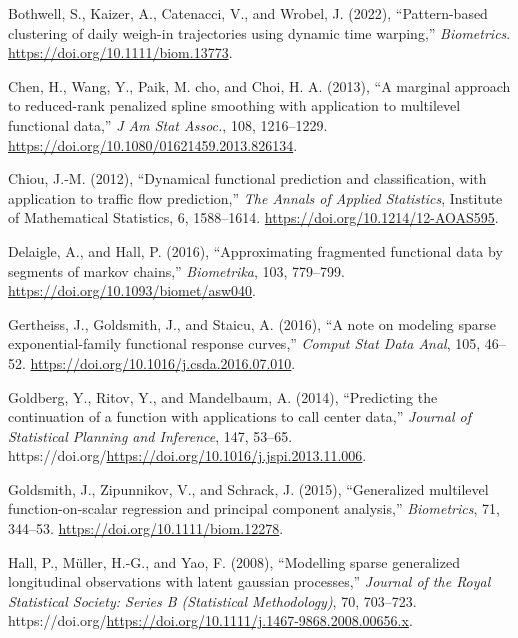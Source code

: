 \documentclass[
  11pt,
]{article}
\newlength{\cslhangindent}
\newlength{\cslentryspacingunit} %
\newenvironment{CSLReferences}[2] %
 {%
  \setlength{\parindent}{0pt}
  \ifodd #1
  \let\oldpar\par
  \def\par{\hangindent=\cslhangindent\oldpar}
  \fi
  \setlength{\parskip}{#2\cslentryspacingunit}
 }%
 {}
\begin{document}
\hypertarget{refs}{}
\begin{CSLReferences}{1}{0}
\leavevmode{}%
Bothwell, S., Kaizer, A., Catenacci, V., and Wrobel, J. (2022),
{``Pattern-based clustering of daily weigh-in trajectories using dynamic
time warping,''} \emph{Biometrics}.
\url{https://doi.org/10.1111/biom.13773}.

\leavevmode{}%
Chen, H., Wang, Y., Paik, M. cho, and Choi, H. A. (2013), {``A marginal
approach to reduced-rank penalized spline smoothing with application to
multilevel functional data,''} \emph{J Am Stat Assoc.}, 108, 1216--1229.
\url{https://doi.org/10.1080/01621459.2013.826134}.

\leavevmode{}%
Chiou, J.-M. (2012), {``Dynamical functional prediction and
classification, with application to traffic flow prediction,''}
\emph{The Annals of Applied Statistics}, Institute of Mathematical
Statistics, 6, 1588--1614. \url{https://doi.org/10.1214/12-AOAS595}.

\leavevmode{}%
Delaigle, A., and Hall, P. (2016), {``Approximating fragmented
functional data by segments of markov chains,''} \emph{Biometrika}, 103,
779--799. \url{https://doi.org/10.1093/biomet/asw040}.

\leavevmode{}%
Gertheiss, J., Goldsmith, J., and Staicu, A. (2016), {``A note on
modeling sparse exponential-family functional response curves,''}
\emph{Comput Stat Data Anal}, 105, 46--52.
\url{https://doi.org/10.1016/j.csda.2016.07.010}.

\leavevmode{}%
Goldberg, Y., Ritov, Y., and Mandelbaum, A. (2014), {``Predicting the
continuation of a function with applications to call center data,''}
\emph{Journal of Statistical Planning and Inference}, 147, 53--65.
https://doi.org/\url{https://doi.org/10.1016/j.jspi.2013.11.006}.

\leavevmode{}%
Goldsmith, J., Zipunnikov, V., and Schrack, J. (2015), {``Generalized
multilevel function-on-scalar regression and principal component
analysis,''} \emph{Biometrics}, 71, 344--53.
\url{https://doi.org/10.1111/biom.12278}.

\leavevmode{}%
Hall, P., Müller, H.-G., and Yao, F. (2008), {``Modelling sparse
generalized longitudinal observations with latent gaussian processes,''}
\emph{Journal of the Royal Statistical Society: Series B (Statistical
Methodology)}, 70, 703--723.
https://doi.org/\url{https://doi.org/10.1111/j.1467-9868.2008.00656.x}.


\end{CSLReferences}
\end{document}

